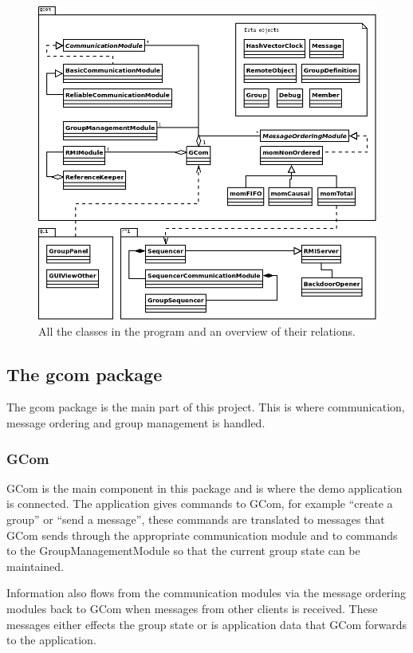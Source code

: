 \documentclass[a4paper,english]{article}
\begin{document}
\begin{figure}
\includegraphics[width=\textwidth]{superuml.png}
\caption{All the classes in the program and an overview of their relations.}
\label{fig:overview}
\end{figure}

\subsection{The gcom package}
The gcom package is the main part of this project. This is where communication, message ordering and group management is handled. 

\subsubsection{GCom}
GCom is the main component in this package and is where the demo application is connected. The application gives commands to GCom, for example ``create a group'' or ``send a message'', these commands are translated to messages that GCom sends through the appropriate communication module and to commands to the GroupManagementModule so that the current group state can be maintained.

Information also flows from the communication modules via the message ordering modules back to GCom when messages from other clients is received. These messages either effects the group state or is application data that GCom forwards to the application. 
\end{document}
